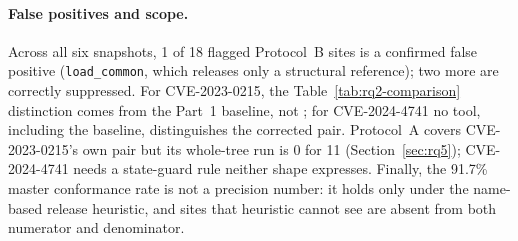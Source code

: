 \paragraph{False positives and scope.} Across all six snapshots, 1 of 18
flagged Protocol~B sites is a confirmed false positive (\texttt{load\_common},
which releases only a structural reference); two more are correctly
suppressed. For CVE-2023-0215, the Table~\ref{tab:rq2-comparison} distinction comes
from the Part~1 baseline, not \tool; for CVE-2024-4741 no tool, including
the baseline, distinguishes the corrected pair. Protocol~A covers CVE-2023-0215's own pair but its whole-tree
run is 0 for 11 (Section~\ref{sec:rq5}); CVE-2024-4741 needs a state-guard
rule neither shape expresses. Finally, the 91.7\% master conformance rate
is not a precision number: it holds only under the name-based release
heuristic, and sites that heuristic cannot see are absent from both
numerator and denominator.
